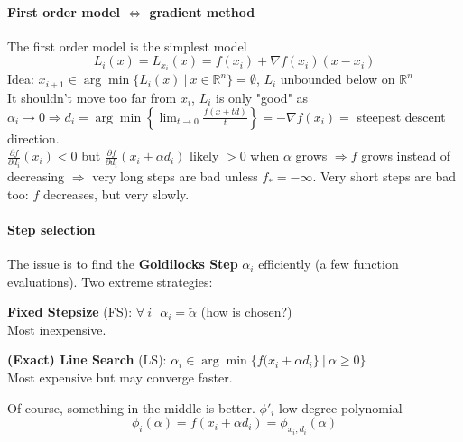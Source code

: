 \documentclass[10pt]{report}
\begin{document}
\paragraph{First order model $\Leftrightarrow$ gradient method} The first order model is the simplest model $$L_i(x) = L_{x_i}(x) = f(x_i) + \nabla f(x_i)(x-x_i)$$ Idea: $x_{i+1} \in \arg\min\{L_i(x)\:|\:x\in \mathbb{R}^n\} = \emptyset$, $L_i$ unbounded below on $\mathbb{R}^n$\\
It shouldn't move too far from $x_i$, $L_i$ is only "good" as $\alpha_i\rightarrow 0 \Rightarrow d_i = \arg\min\left\{\lim_{t\to 0} \frac{f(x+td)}{t}\right\} = -\nabla f(x_i) =$ steepest descent direction.\\
$\frac{\partial f}{\partial d_i}(x_i) < 0$ but $\frac{\partial f}{\partial d_i}(x_i + \alpha d_i)$ likely $> 0$ when $\alpha$ grows $\Rightarrow f$ grows instead of decreasing $\Rightarrow$ very long steps are bad unless $f_* = -\infty$. Very short steps are bad too: $f$ decreases, but very slowly.
\paragraph{Step selection} The issue is to find the \textbf{Goldilocks Step} $\alpha_i$ efficiently (a few function evaluations). Two extreme strategies:
\begin{list}{}{}
	\item \textbf{Fixed Stepsize} (FS): $\forall\:i\:\:\:\alpha_i = \tilde{\alpha}$ (how is chosen?)\\
	Most inexpensive.
	\item \textbf{(Exact) Line Search} (LS): $\alpha_i\in \arg\min\{f(x_i+\alpha d_i\}\:|\:\alpha\geq 0\}$\\
	Most expensive but may converge faster.
\end{list}
Of course, something in the middle is better. $\phi'_i$ low-degree polynomial
$$\phi_i(\alpha) = f(x_i+\alpha d_i) = \phi_{x_i,d_i}(\alpha)$$
\end{document}
